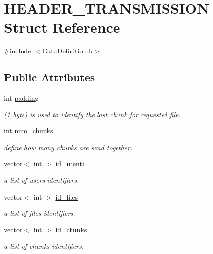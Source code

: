 \hypertarget{structHEADER__TRANSMISSION}{\section{H\-E\-A\-D\-E\-R\-\_\-\-T\-R\-A\-N\-S\-M\-I\-S\-S\-I\-O\-N Struct Reference}
\label{structHEADER__TRANSMISSION}
}


{\ttfamily \#include $<$Data\-Definition.\-h$>$}

\subsection*{Public Attributes}
\begin{DoxyCompactItemize}
\item 
int \hyperlink{structHEADER__TRANSMISSION_a74de1a2343e132bf28eb6e83b4601d34}{padding}
\begin{DoxyCompactList}\small\item\em (1 byte) is used to identify the last chunk for requested file. \end{DoxyCompactList}\item 
int \hyperlink{structHEADER__TRANSMISSION_abee64c077b815db300d99d1e2a273af7}{num\-\_\-chunks}
\begin{DoxyCompactList}\small\item\em define how many chunks are send together. \end{DoxyCompactList}\item 
vector$<$ int $>$ \hyperlink{structHEADER__TRANSMISSION_ae1d8e1fcc8178250b212f77325022424}{id\-\_\-utenti}
\begin{DoxyCompactList}\small\item\em a list of users identifiers. \end{DoxyCompactList}\item 
vector$<$ int $>$ \hyperlink{structHEADER__TRANSMISSION_a7d6396f1a9a35defc1b44e00c663b412}{id\-\_\-files}
\begin{DoxyCompactList}\small\item\em a list of files identifiers. \end{DoxyCompactList}\item 
vector$<$ int $>$ \hyperlink{structHEADER__TRANSMISSION_a3fa5dd88f6fc08f8c64eaee74408ce0e}{id\-\_\-chunks}
\begin{DoxyCompactList}\small\item\em a list of chunks identifiers. \end{DoxyCompactList}\item 

\end{DoxyCompactItemize}
